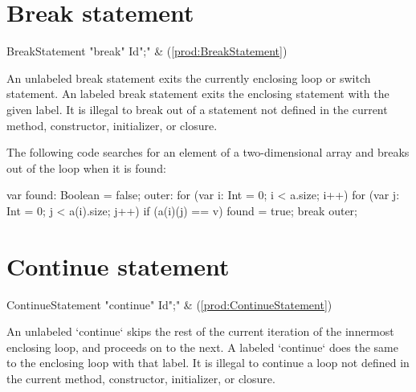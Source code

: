\section{Break statement}

\begin{bbgrammar}
      BreakStatement \: \xcd"break" Id\opt \xcd";" & (\ref{prod:BreakStatement}) \\
\end{bbgrammar}


An unlabeled break statement exits the currently enclosing loop or switch
statement. An labeled break statement exits the enclosing 
statement with the given label.
It is illegal to break out of a statement not defined in the current
method, constructor, initializer, or closure.  

\begin{ex}
The following code searches for an element of a two-dimensional
array and breaks out of the loop when it is found:
\begin{xten}
var found: Boolean = false;
outer: for (var i: Int = 0; i < a.size; i++)
    for (var j: Int = 0; j < a(i).size; j++)
        if (a(i)(j) == v) {
            found = true;
            break outer;
        }
\end{xten}
\end{ex}

\section{Continue statement}

\begin{bbgrammar}
   ContinueStatement \: \xcd"continue" Id\opt \xcd";" & (\ref{prod:ContinueStatement}) \\
\end{bbgrammar}
An unlabeled \xcd`continue` skips the rest of the current iteration of the
innermost enclosing loop, and proceeds on to the next.  A labeled
\xcd`continue` does the same to the enclosing loop with that label.
It is illegal to continue a loop not defined in the current
method, constructor, initializer, or closure.


